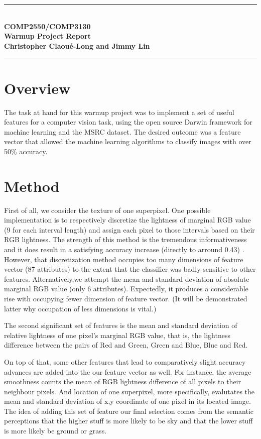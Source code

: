 \documentclass[12pt,a4paper]{article}
\newcommand{\Hrule}{\textcolor{blue}{\rule{\linewidth}{0.5mm}}}
\begin{document}
\begin{center}
\Hrule\\
\textbf{\Huge COMP2550/COMP3130\\Warmup Project Report}\\
\textbf{\large Christopher Claou\'e-Long and Jimmy Lin}\\
\Hrule
\end{center}
\begin{multicols}{2}
\section{Overview}
The task at hand for this warmup project was to implement a set of useful features for a computer vision task, using the open source Darwin framework for machine learning and the MSRC dataset.  The desired outcome was a feature vector that allowed the machine learning algorithms to classify images with over 50\% accuracy.

\section{Method}

\hspace{4mm} First of all, we consider the texture of one superpixel. One possible implementation is to respectively discretize the lightness of marginal RGB value (9 for each interval length) and assign each pixel to those intervals based on their RGB lightness. The strength of this method is the tremendous informativeness and it does result in a satisfying accuracy increase (directly to arround 0.43) . However, that discretization method occupies too many dimensions of feature vector (87 attributes) to the extent that the classifier was badly sensitive to other features. Alternatively,we attempt the mean and standard deviation of absolute marginal RGB value (only 6 attributes). Expectedly, it produces a considerable rise with occupying fewer dimension of feature vector. (It will be demonstrated latter why occupation of less dimensions is vital.) 

The second significant set of features is the mean and standard deviation of relative lightness of one pixel's marginal RGB value, that is, the lightness difference between the pairs of Red and Green, Green and Blue, Blue and Red. 

On top of that, some other features that lead to comparatively slight accuracy advances are added into the our feature vector as well. For instance, the average smoothness counts the mean of RGB lightness difference of all pixels to their neighbour pixels. And location of one superpixel, more specifically, evalutates the mean and standard deviation of x,y coordinate of one pixel in its located image. The idea of adding this set of feature our final selection comes from the semantic perceptions that the higher stuff is more likely to be sky and that the lower stuff is more likely be ground or grass. 


\end{multicols}
\end{document}
